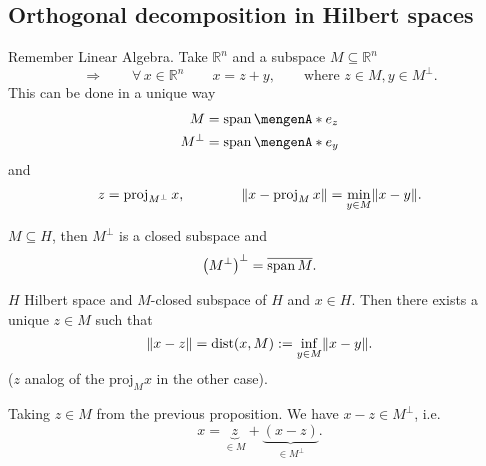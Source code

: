 \subsection{Orthogonal decomposition in Hilbert spaces} 
\label{sub:orthogonal_decomposition_in_hilber_spaces}

Remember Linear Algebra. Take $\mathbb{R}^n$ and a subspace $M \subseteq \mathbb{R}^n$ 
\[
	\Rightarrow \qquad \forall\, x \in \mathbb{R}^n \qquad x = z + y, \qquad \text{where }z \in M, y \in M^{\perp}.
\]
This can be done in a unique way
\begin{align*}
	M &= \spn \set{e_z} \\ 
	M^{\perp} &= \spn\set{e_y}
\end{align*}
and
\[
	z = \proj_{M^{\perp}}x, \qquad \qquad \norm{x - \proj_Mx} = \min_{y \in M}\norm{x-y}.
\]


\begin{proposition}
	$M \subseteq H$, then $M^{\perp}$ is a closed subspace and
	\[
		\left( M^{\perp} \right)^{\perp} = \overline{\operatorname{span} M}.
	\]
\end{proposition}

\begin{satz}
	$H$ Hilbert space and $M$-closed subspace of $H$ and $x \in H$. Then there exists a unique $z \in M$ such that
	\[
		\norm{x-z} = \dist(x,M) := \inf_{y \in M} \norm{x-y}.
	\]
	($z$ analog of the $\text{proj}_Mx$ in the other case).
\end{satz}

\begin{proposition}
	Taking $z \in M$ from the previous proposition. We have $x - z \in M^{\perp}$, i.e.
	\[
		x = \underset{\in M}{\underbrace{z}} + \underset{\in M^{\perp}}{\underbrace{(x - z)}}.
	\]
\end{proposition}